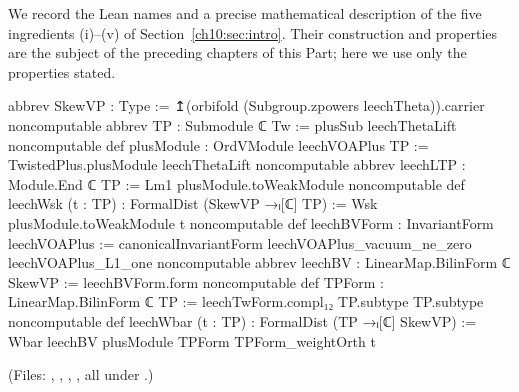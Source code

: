 We record the Lean names and a precise mathematical description of the five ingredients
(i)--(v) of Section~\ref{ch10:sec:intro}.  Their construction and properties are the subject of
the preceding chapters of this Part; here we use only the properties stated.

\begin{leancode}
abbrev SkewVP : Type := ↥(orbifold (Subgroup.zpowers leechTheta)).carrier
noncomputable abbrev TP : Submodule ℂ Tw := plusSub leechThetaLift
noncomputable def plusModule : OrdVModule leechVOAPlus TP :=
  TwistedPlus.plusModule leechThetaLift
noncomputable abbrev leechLTP : Module.End ℂ TP := Lm1 plusModule.toWeakModule
noncomputable def leechWsk (t : TP) : FormalDist (SkewVP →ₗ[ℂ] TP) :=
  Wsk plusModule.toWeakModule t
noncomputable def leechBVForm : InvariantForm leechVOAPlus :=
  canonicalInvariantForm leechVOAPlus_vacuum_ne_zero leechVOAPlus_L1_one
noncomputable abbrev leechBV : LinearMap.BilinForm ℂ SkewVP := leechBVForm.form
noncomputable def TPForm : LinearMap.BilinForm ℂ TP :=
  leechTwForm.compl₁₂ TP.subtype TP.subtype
noncomputable def leechWbar (t : TP) : FormalDist (TP →ₗ[ℂ] SkewVP) :=
  Wbar leechBV plusModule TPForm TPForm_weightOrth t
\end{leancode}
(Files: , , ,
, all under .)

